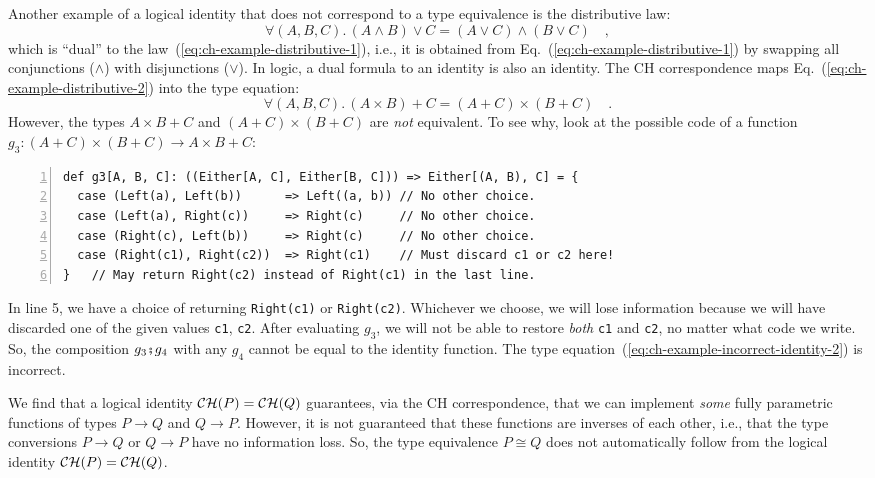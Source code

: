 Another example of a logical identity that does not correspond to
a type equivalence is the distributive law:
\begin{equation}
\forall(A,B,C).\,\left(A\wedge B\right)\vee C=\left(A\vee C\right)\wedge\left(B\vee C\right)\quad,\label{eq:ch-example-distributive-2}
\end{equation}
which is \textsf{``}dual\textsf{''} to the law~(\ref{eq:ch-example-distributive-1}),
i.e., it is obtained from Eq.~(\ref{eq:ch-example-distributive-1})
by swapping all conjunctions ($\wedge$) with disjunctions ($\vee$).
In logic, a dual formula to an identity is also an identity. The CH
correspondence maps Eq.~(\ref{eq:ch-example-distributive-2}) into
the type equation:
\begin{equation}
\forall(A,B,C).\,\left(A\times B\right)+C=\left(A+C\right)\times\left(B+C\right)\quad.\label{eq:ch-example-incorrect-identity-2}
\end{equation}
However, the types $A\times B+C$ and $\left(A+C\right)\times\left(B+C\right)$
are \emph{not} equivalent. To see why, look at the possible code of
a function $g_{3}:\left(A+C\right)\times\left(B+C\right)\rightarrow A\times B+C$:
\begin{lstlisting}[numbers=left]
def g3[A, B, C]: ((Either[A, C], Either[B, C])) => Either[(A, B), C] = {
  case (Left(a), Left(b))      => Left((a, b)) // No other choice.
  case (Left(a), Right(c))     => Right(c)     // No other choice.
  case (Right(c), Left(b))     => Right(c)     // No other choice.
  case (Right(c1), Right(c2))  => Right(c1)    // Must discard c1 or c2 here!
}   // May return Right(c2) instead of Right(c1) in the last line.
\end{lstlisting}
In line 5, we have a choice of returning \lstinline!Right(c1)! or
\lstinline!Right(c2)!. Whichever we choose, we will lose information
because we will have discarded one of the given values \lstinline!c1!,
\lstinline!c2!. After evaluating $g_{3}$, we will not be able to
restore \emph{both} \lstinline!c1! and \lstinline!c2!, no matter
what code we write. So, the composition $g_{3}\bef g_{4}$ with any
$g_{4}$ cannot be equal to the identity function. The type equation~(\ref{eq:ch-example-incorrect-identity-2})
is incorrect.

We find that a logical identity ${\cal CH}(P)={\cal CH}(Q)$ guarantees,
via the CH correspondence, that we can implement \emph{some} fully
parametric functions of types $P\rightarrow Q$ and $Q\rightarrow P$.
However, it is not guaranteed that these functions are inverses of
each other, i.e., that the type conversions $P\rightarrow Q$ or $Q\rightarrow P$
have no information loss. So, the type equivalence
$P\cong Q$ does not automatically follow from the logical identity
${\cal CH}(P)={\cal CH}(Q)$.

